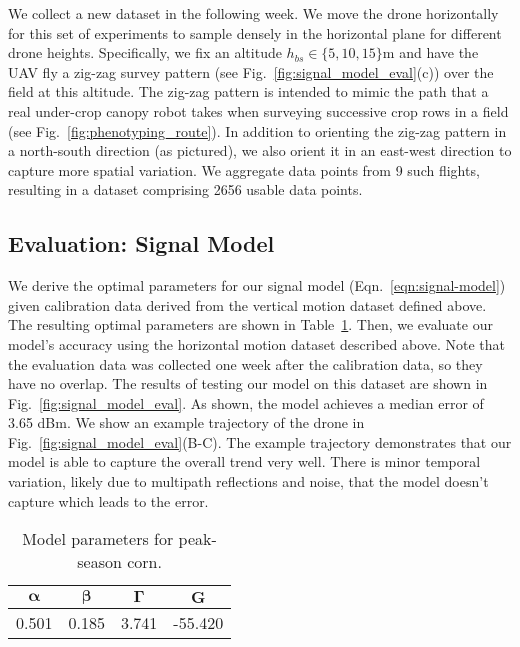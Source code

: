 We collect a new dataset in the following week. We move the drone horizontally for this set of experiments to sample densely in the horizontal plane for different drone heights. Specifically, we fix an altitude $h_{bs} \in \{5, 10, 15\}$m and have the UAV fly a zig-zag survey pattern (see Fig.~\ref{fig:signal_model_eval}(c)) over the field at this altitude. The zig-zag pattern is intended to mimic the path that a real under-crop canopy robot takes when surveying successive crop rows in a field (see Fig.~\ref{fig:phenotyping_route}). In addition to orienting the zig-zag pattern in a north-south direction (as pictured), we also orient it in an east-west direction to capture more spatial variation. We aggregate data points from 9 such flights, resulting in a dataset comprising 2656 usable data points. 

\subsection{Evaluation: Signal Model}\label{sec:eval_model}


We derive the optimal parameters for our signal model (Eqn.~\ref{eqn:signal-model}) given calibration data derived from the vertical motion dataset defined above. The resulting optimal parameters are shown in Table~\ref{tab:model_parameters}. Then, we evaluate our model's accuracy using the horizontal motion dataset described above. Note that the evaluation data was collected one week after the calibration data, so they have no overlap. The results of testing our model on this dataset are shown in Fig.~\ref{fig:signal_model_eval}. As shown, the model achieves a median error of 3.65 dBm. We show an example trajectory of the drone in Fig.~\ref{fig:signal_model_eval}(B-C). The example trajectory demonstrates that our model is able to capture the overall trend very well. There is minor temporal variation, likely due to multipath reflections and noise, that the model doesn't capture which leads to the error.

\begin{table}[h!]
\centering
\vspace{-0.1in}
\caption{Model parameters for peak-season corn.}
\vspace{-0.15in}
\begin{tabular}{cccc}
\toprule
$\bm{\alpha}$ & $\bm{\beta}$ & $\bm{\Gamma}$ & $\bm{G}$ \\
\midrule
 0.501 & 0.185 & 3.741 & -55.420 \\
\bottomrule
\end{tabular}
\label{tab:model_parameters}
\vspace{-0.15in}
\end{table}



